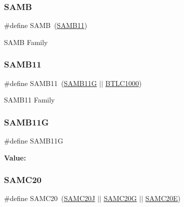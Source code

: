 \subsubsection{\texorpdfstring{SAMB}{SAMB}}
{\footnotesize\ttfamily \#define S\+A\+MB~(\mbox{\hyperlink{group__sam__part__macros__group_ga2af5455979bc458995adea5aaa7807a2}{S\+A\+M\+B11}})}

S\+A\+MB Family \mbox{\label{group__sam__part__macros__group_ga2af5455979bc458995adea5aaa7807a2}} 
\subsubsection{\texorpdfstring{SAMB11}{SAMB11}}
{\footnotesize\ttfamily \#define S\+A\+M\+B11~(\mbox{\hyperlink{group__sam__part__macros__group_ga9d75ea612675a9caabb228e7e0751ff7}{S\+A\+M\+B11G}} $\vert$$\vert$ \mbox{\hyperlink{group__sam__part__macros__group_gaa7c0614df11bc3398897ee31d038dde7}{B\+T\+L\+C1000}})}

S\+A\+M\+B11 Family \mbox{\label{group__sam__part__macros__group_ga9d75ea612675a9caabb228e7e0751ff7}} 
\subsubsection{\texorpdfstring{SAMB11G}{SAMB11G}}
{\footnotesize\ttfamily \#define S\+A\+M\+B11G}

{\bfseries Value\+:}
\begin{DoxyCode}{0}
\DoxyCodeLine{( \(\backslash\)}
\DoxyCodeLine{    )}

\end{DoxyCode}
\mbox{\label{group__sam__part__macros__group_gaac043547d8783c0cba34b7d3139c53a0}} 
\subsubsection{\texorpdfstring{SAMC20}{SAMC20}}
{\footnotesize\ttfamily \#define S\+A\+M\+C20~(\mbox{\hyperlink{group__sam__part__macros__group_gaf87c13f9dc254f1b09d6a4510e1f43bd}{S\+A\+M\+C20J}} $\vert$$\vert$ \mbox{\hyperlink{group__sam__part__macros__group_gaae8339de60d66fd1ea8ab4d71500eee3}{S\+A\+M\+C20G}} $\vert$$\vert$ \mbox{\hyperlink{group__sam__part__macros__group_gafa6a3f9330468b268688f59c9baa8120}{S\+A\+M\+C20E}})}

